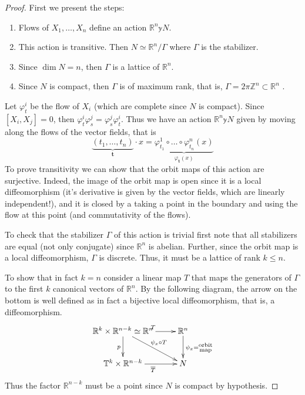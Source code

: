 \begin{proof}
First we present the steps:
\begin{enumerate}
\item Flows of $X_1,\ldots,X_n$ define an action $\mathbb{R}^n \mathbb{y} N$.

\item This action is transitive. Then $N \simeq \mathbb{R}^n/\Gamma$
where $\Gamma$ is the stabilizer.

\item Since $\dim N=n$, then  $\Gamma$ is a lattice of $\mathbb{R}^n$.

\item Since $N$ is compact, then $\Gamma$ is of maximum rank, that is,
$\Gamma=2\pi \mathbb{Z}^n \subset \mathbb{R}^n$ .
\end{enumerate}


Let $\varphi^i_t$ be the flow of $X_i$ (which are complete since $N$ is
compact).
Since $[X_i,X_j]=0$, then $\varphi_t^i \varphi_s^j=\varphi_s^j \varphi^i_t$.
Thus we have an action $\mathbb{R}^n\mathbb{y} N$
given by moving along the flows of the vector fields, that is
$$
\underbrace{(t_1,\ldots,t_n)}_{\mathbf{t}}\cdot x
=\underbrace{\varphi_{t_1}^1 \circ \ldots \circ \varphi_{t_n}^n(x)}_{
\varphi_{\mathbf{t}}(x)}
$$
To prove transitivity 
we can show that the orbit maps of this action are surjective.
Indeed, the image of the orbit map is open since it is a local
diffeomorphism (it's derivative is given by the vector fields,
which are linearly independent!),
and it is closed by a taking a point in the boundary and 
using the flow at this point (and commutativity of the flows).

To check that the stabilizer $\Gamma$ of this action is trivial
first note that all stabilizers are equal
(not only conjugate) since $\mathbb{R}^n$ is abelian.
Further, since the orbit map is a local diffeomorphism,
$\Gamma$ is discrete. Thus, it must be a lattice of rank $k \leq n$.

To show that in fact $k=n$ consider a linear map  $T$ 
that maps the generators of $\Gamma$ to the first $k$ canonical 
vectors of $\mathbb{R}^n$. By the following diagram, the arrow on the bottom
is well defined as in fact a bijective local diffeomorphism,
that is, a diffeomorphism.
$$
\xymatrix{
\mathbb{R}^k \times\mathbb{R}^{n-k} \simeq \mathbb{R}^n\ar[r]^{T}\ar[d]_{p}
\ar[dr]^{\psi_x \circ T}&
\mathbb{R}^n\ar[d]^{\psi_x=\substack{\text{orbit} \\ \text{map}}}\\
\mathbb{T}^k \times \mathbb{R}^{n-k}\ar[r]_{\overline{T}}&
N
}
$$
Thus the factor $\mathbb{R}^{n-k}$ must be a point since $N$ is
compact by hypothesis.
\end{proof}

